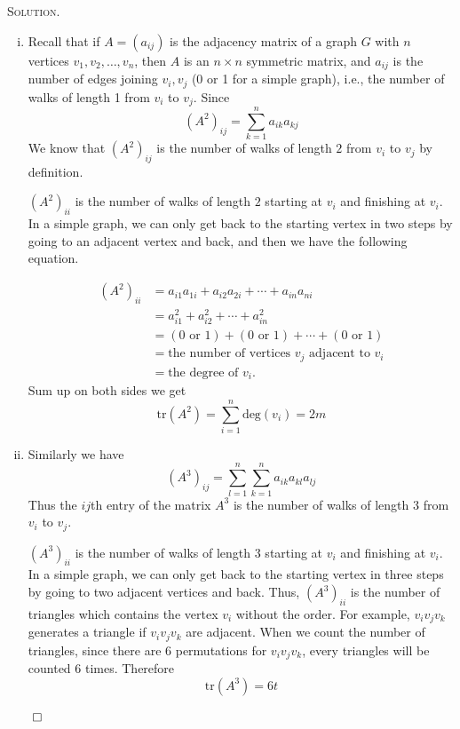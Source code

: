 \documentclass[12pt, a4paper, oneside]{ctexart}
\newenvironment{solution}{%
	\par\noindent\textsc{Solution. }\ignorespaces
}{%
	\hfill$\qed$\par
}
\begin{document}
	\begin{solution}
		
		\begin{enumerate}[(i)]
			\item Recall that if \( A = (a_{ij}) \) is the adjacency matrix of a graph \( G \) with \( n \) vertices \( v_1, v_2, \dots, v_n \), then \( A \) is an \( n \times n \) symmetric matrix, and \( a_{ij} \) is the number of edges joining \( v_i, v_j \) (0 or 1 for a simple graph), i.e., the number of walks of length 1 from \( v_i \) to \( v_j \). 
			Since \[(A^2)_{ij} = \sum_{k = 1}^{n}a_{ik}a_{kj}\]
			We know that \( (A^2)_{ij} \) is the number of walks of length \( 2 \) from \( v_i \) to \( v_j \) by definition.

			\( (A^2)_{ii} \) is the number of walks of length $2$ starting at \( v_i \) and finishing at \( v_i \). In a simple graph, we can only get back to the starting vertex in two steps by going to an adjacent vertex and back, and then we have the following equation.
			
			\[
			\begin{aligned}
    			(A^2)_{ii} &= a_{i1}a_{1i} + a_{i2}a_{2i} + \cdots + a_{in}a_{ni} \\
    			&= a_{i1}^2 + a_{i2}^2 + \cdots + a_{in}^2 \\
    			&= (0 \text{ or } 1) + (0 \text{ or } 1) + \cdots + (0 \text{ or } 1) \\
    			&= \text{the number of vertices } v_j \text{ adjacent to } v_i \\
    			&= \text{the degree of } v_i.
			\end{aligned}
			\]
			Sum up on both sides we get 
			\[ \text{tr}(A^2) = \sum_{i=1}^{n}\text{deg}(v_i) = 2m\]
			\item Similarly we have \[(A^3)_{ij} = \sum_{l=1}^{n}\sum_{k=1}^{n}a_{ik}a_{kl}a_{lj}\]
			Thus the $ij$th entry of the matrix $A^3$ is the number of walks of length $3$ from $v_i$ to $v_j$.

			\( (A^3)_{ii} \) is the number of walks of length $3$ starting at \( v_i \) and finishing at \( v_i \). In a simple graph, we can only get back to the starting vertex in three steps by going to two adjacent vertices and back.
			Thus, $(A^3)_{ii}$ is the number of triangles which contains the vertex $v_i$ without the order. For example, $v_iv_jv_k$ generates a triangle if $v_iv_jv_k$ are adjacent.
			When we count the number of triangles, since there are $6$ permutations for $v_iv_jv_k$, every triangles will be counted $6$ times. Therefore
			\[\text{tr}(A^3) = 6t\]

		\end{enumerate}

	\end{solution}
\end{document}
